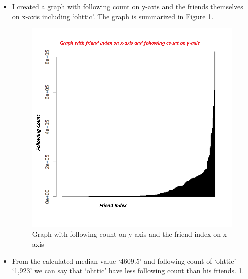 \begin{itemize}
\newpage
\item I created a graph with following count on y-axis and the friends themselves on x-axis including `ohttic'. The graph is summarized in Figure \ref{fig:q4fig2}.
\begin{figure}[h!]
\begin{center}
\includegraphics[scale=0.55, keepaspectratio=true]{figures/followingWithoutLog.PNG}
\caption{Graph with following count on y-axis and the friend index on x-axis }
\label{fig:q4fig2}
\end{center}
\end{figure}
\newpage
\item From the calculated median value `4609.5' and following count of `ohttic' `1,923' we can say that `ohttic' have less following count than his friends.
\ref{fig:q4fig2}.
\begin{figure}[h!]
\begin{center}

\end{center}
\end{figure}
\end{itemize}
